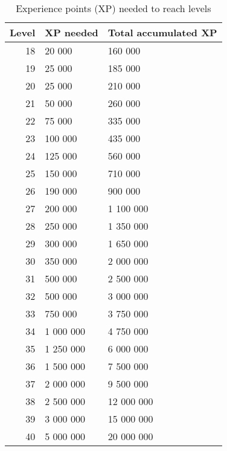 \begin{table}[h]
	\centering
	\caption{Experience points (XP) needed to reach levels}
	\label{tbl:experience-per-level}
	\begin{tabular}{|r|l|l|}
		\hline
		\textbf{Level} & \textbf{XP needed} & \textbf{Total accumulated XP}\\\hline\hline
		18 & 20 000 & 160 000\\\hline
		19 & 25 000 & 185 000\\\hline
		20 & 25 000 & 210 000\\\hline
		21 & 50 000 & 260 000\\\hline
		22 & 75 000 & 335 000\\\hline
		23 & 100 000 & 435 000\\\hline
		24 & 125 000 & 560 000\\\hline
		25 & 150 000 & 710 000\\\hline
		26 & 190 000 & 900 000\\\hline
		27 & 200 000 & 1 100 000\\\hline
		28 & 250 000 & 1 350 000\\\hline
		29 & 300 000 & 1 650 000\\\hline
		30 & 350 000 & 2 000 000\\\hline
		31 & 500 000 & 2 500 000\\\hline
		32 & 500 000 & 3 000 000\\\hline
		33 & 750 000 & 3 750 000\\\hline
		34 & 1 000 000 & 4 750 000\\\hline
		35 & 1 250 000 & 6 000 000\\\hline
		36 & 1 500 000 & 7 500 000\\\hline
		37 & 2 000 000 & 9 500 000\\\hline
		38 & 2 500 000 & 12 000 000\\\hline
		39 & 3 000 000 & 15 000 000\\\hline
		40 & 5 000 000 & 20 000 000\\\hline
	\end{tabular}
\end{table}

